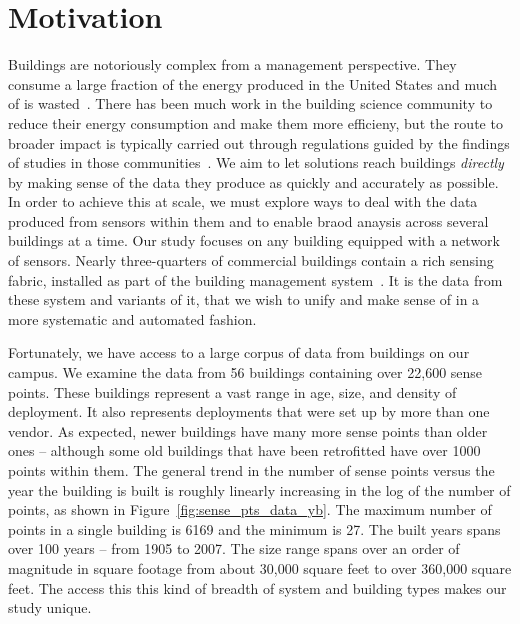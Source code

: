 \section{Motivation}

Buildings are notoriously complex from a management perspective.  They consume a large fraction
of the energy produced in the United States and much of is wasted~\cite{epa}.  There has been
much work in the building science community to reduce their energy consumption and make them more
efficieny, but the route to broader impact is typically carried out through regulations guided
by the findings of studies in those communities~\cite{regulation}.
We aim to let solutions reach buildings \emph{directly} by making sense of the data they produce
as quickly and accurately as possible.
In order to achieve this at scale, we must explore ways to deal with the data produced
from sensors within them and to enable braod anaysis across several buildings at a time. Our study
focuses on any building equipped with a network of sensors.  Nearly 
three-quarters of commercial buildings contain a rich sensing fabric, installed as part
of the building management system~\cite{study}.  
It is the data from these system and variants of it, that
we wish to unify and make sense of in a more systematic and automated fashion.

Fortunately, we have access to a large corpus of data from buildings on our campus.
We examine the data from 56 buildings containing over 22,600 sense points. These buildings 
represent a vast range in age, size, and density of deployment.  It also represents deployments
that were set up by more than one vendor.  As expected, newer buildings have many more sense 
points than older ones -- although some old buildings that have been retrofitted have over 1000  
points within them. The general trend in the number of sense points versus the year the 
building is built is roughly linearly increasing in the log of the number of points, as shown
in Figure~\ref{fig:sense_pts_data_yb}.  
The maximum number of points in a 
single building is 6169 and the minimum is 27.   The built years spans over 100 years -- from 
1905 to 2007. The size range spans over an order of magnitude 
in square footage from about 30,000 square feet to over 360,000 square feet.  The access this
this kind of breadth of system and building types makes our study unique.

